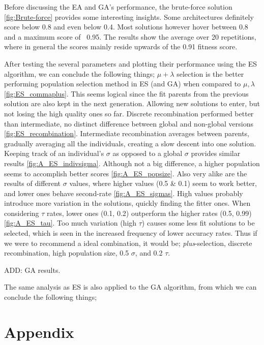 \documentclass{article}
\begin{document}
Before discussing the EA and GA's performance, the brute-force solution \ref{fig:Brute-force} provides some interesting insights. Some architectures definitely score below 0.8 and even below 0.4. Most solutions however hover between 0.8 and a maximum score of ~0.95. The results show the average over 20 repetitions, where in general the scores mainly reside upwards of the 0.91 fitness score. 

After testing the several parameters and plotting their performance using the ES algorithm, we can conclude the following things;
$\mu + \lambda$ selection is the better performing population selection method in ES (and GA) when compared to $\mu , \lambda$ \ref{fig:ES_commaplus}.
This seems logical since the fit parents from the previous solution are also kept in the next generation.
Allowing new solutions to enter, but not losing the high quality ones so far.
Discrete recombination performed better than intermediate, no distinct difference between global and non-global versions \ref{fig:ES_recombination}. 
Intermediate recombination averages between parents, gradually averaging all the individuals, creating a slow descent into one solution.  
Keeping track of an individual's $\sigma$ as opposed to a global $\sigma$ provides similar results \ref{fig:A_ES_indivsigma}.
Although not a big difference, a higher population seems to accomplish better scores \ref{fig:A_ES_popsize}. 
Also very alike are the results of different $\sigma$ values, where higher values (0.5 \& 0.1) seem to work better, and lower ones behave second-rate \ref{fig:A_ES_sigmas}. 
High values probably introduce more variation in the solutions, quickly finding the fitter ones.
When considering $\tau$ rates, lower ones (0.1, 0.2) outperform the higher rates (0.5, 0.99) \ref{fig:A_ES_tau}.
Too much variation (high $\tau$) causes some less fit solutions to be selected, which is seen in the increased frequency of lower accuracy rates.
Thus if we were to recommend a ideal combination, it would be; \textit{plus}-selection, discrete recombination, high population size, 0.5 $\sigma$, and 0.2 $\tau$. 

ADD: GA results. 

The same analysis as ES is also applied to the GA algorithm, from which we can conclude the following things;

  
  


\newpage

\appendix
\section{Appendix}
\label{sec:app}
\end{document}
